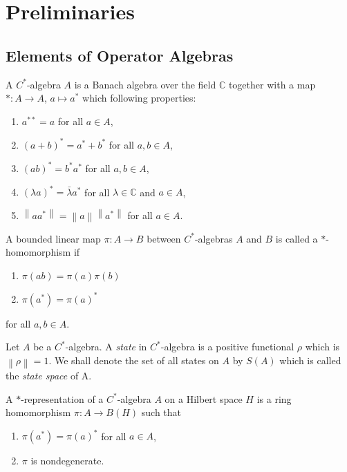\chapter{Preliminaries}

\section{Elements of Operator Algebras}

A \(C^\ast\)-algebra \(A\) is a Banach algebra over the field \(\mathbb{C}\) together with a map \(\ast: A \to A\), \(a \mapsto a^\ast\) which following properties:
\begin{enumerate}
    \item \(a^{\ast\ast}=a\) for all \(a \in A\),
    \item \((a+b)^\ast=a^\ast+b^\ast\) for all \(a,b \in A\),
    \item \((ab)^\ast = b^\ast a^\ast\) for all \(a,b \in A\),
    \item \((\lambda a)^\ast = \bar{\lambda}a^\ast\) for all \(\lambda \in \mathbb{C}\) and \(a \in A\),
    \item \(\left \lVert aa^\ast \right \rVert = \left \lVert a \right \rVert \left \lVert a^\ast \right \rVert\) for all \(a \in A\).
\end{enumerate}

A bounded linear map \(\pi:A \to B\) between \(C^\ast\)-algebras \(A\) and \(B\) is called a \(\ast\)-homomorphism if
\begin{enumerate}
    \item \(\pi(ab)=\pi(a)\pi(b)\)
    \item \(\pi(a^\ast) = \pi(a)^\ast\)
\end{enumerate}
for all \(a,b \in A\).

Let \(A\) be a \(C^\ast\)-algebra. A \emph{state} in \(C^\ast\)-algebra is a positive functional \(\rho\) which is \(\left \lVert \rho \right \rVert=1\). We shall denote the set of all states on \(A\) by \(S(A)\) which is called the \emph{state space} of A.

A \(\ast\)-representation of a \(C^\ast\)-algebra \(A\) on a Hilbert space \(H\) is a ring homomorphism \(\pi: A \to B(H)\) such that
\begin{enumerate}
    \item \(\pi(a^\ast)=\pi(a)^\ast\) for all \(a \in A\),
    \item \(\pi\) is nondegenerate.
\end{enumerate}

